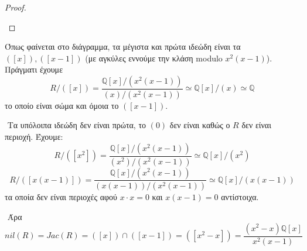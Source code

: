 \documentclass[oneside,a4paper]{article}
\newcommand {\tl}{\textlatin}
\newcommand{\Q}{\mathbb{Q}}
\begin{document}
\begin{proof}
\begin{enumerate}
\begin{center}
\end{center}
	\end{enumerate}
\end{proof}

Όπως φαίνεται στο διάγραμμα, τα μέγιστα και πρώτα ιδεώδη είναι τα $([x]),([x-1])$ (με αγκύλες εννούμε την κλάση \tl{modulo} $x^2(x-1)$).
Πράγματι έχουμε
$$R/([x]) = \frac{\Q[x]/(x^2(x-1))}{(x)/(x^2(x-1))} \simeq \Q[x]/(x) \simeq \Q$$
το οποίο είναι σώμα και όμοια το $([x-1])$.

$ $\newline
Τα υπόλοιπα ιδεώδη δεν είναι πρώτα, το $(0)$ δεν είναι καθώς ο $R$ δεν είναι περιοχή. Έχουμε:
$$R/([x^2]) = \frac{\Q[x]/(x^2(x-1))}{(x^2)/(x^2(x-1))} \simeq \Q[x]/(x^2) $$
$$R/([x(x-1)]) = \frac{\Q[x]/(x^2(x-1))}{(x(x-1))/(x^2(x-1))} \simeq \Q[x]/(x(x-1))$$
τα οποία δεν είναι περιοχές αφού $x\cdot x= 0$ και $x(x-1) = 0$ αντίστοιχα.

$ $\newline
Άρα
$$nil(R) = Jac(R) = ([x])\cap ([x-1]) = ([x^2 - x]) = \frac{(x^2 - x)\Q [x]}{x^2(x-1)}$$

\pagebreak
\end{document}

